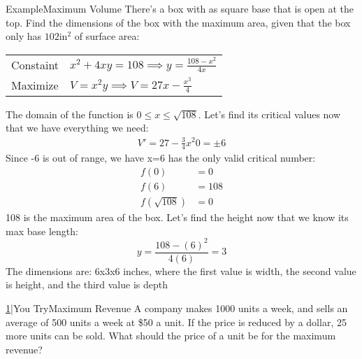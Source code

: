 \documentclass{MathNotes}
\newenvironment{example}[1]{\begin{BlueBox}{Example}{#1}}{\end{BlueBox}}
\newenvironment{practice}[2]{\begin{PurpleBox}{\texorpdfstring{#1}\Big|You Try}{#2}}{\end{PurpleBox}}
\begin{document}
\begin{example}{Maximum Volume}
There's a box with as square base that is open at the top. Find the dimensions of the box with the maximum area, given that the box only has $102\text{in}^2$ of surface area:\newline
\begin{center}
\begin{tabular}{ll}
Constaint & $x^2+4xy=108\implies y=\frac{108-x^2}{4x}$\\
Maximize & $V=x^2y\implies V=27x-\frac{x^3}{4}$
\end{tabular}
\end{center}
The domain of the function is $0\leq x\leq\sqrt{108}$. Let's find its critical
values now that we have everything we need:
\begin{align*}
V'=27-\frac{3}{4}x^2
0=\pm 6
\end{align*}
Since -6 is out of range, we have x=6 has the only valid critical number:
\begin{align*}
f(0)&=0\\
f(6)&=108\\
f(\sqrt{108})&=0
\end{align*}
108 is the maximum area of the box. Let's find the height now that we know its
max base length: $$y=\frac{108-(6)^2}{4(6)}=3$$
The dimensions are: 6x3x6 inches, where the first value is width, the second value is height, and the third value is depth
\end{example}
\begin{practice}{\hyperref[ans:3.5-1]{1}}{Maximum Revenue}\label{prac:3.5-1}
A company makes 1000 units a week, and sells an average of 500 units a week at \$50 a unit. If the price is reduced by a dollar, 25 more units can be sold. What should the price of a unit be for the maximum revenue?
\end{practice}

\end{document}

